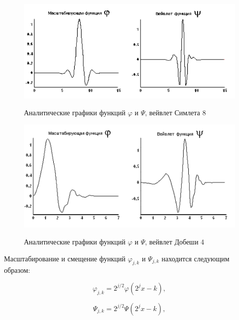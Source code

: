 \documentclass[utf8x, 14pt, oneside, a4paper]{article}
\begin{document}
	\newpage

	\begin{figure}[h!]
		\begin{center}
			{\includegraphics[scale = 1.0]{img/wavelet_simlet8.png}}
		\end{center}
		\caption{Аналитические графики функций $\varphi$ и $\Psi$, вейвлет Симлета 8}
		\label{ris:wavelet_simlet8}
	\end{figure}

	\begin{figure}[h!]
		\begin{center}
			{\includegraphics[scale = 0.8]{img/wavelet_dobeshi4.png}}
		\end{center}
		\caption{Аналитические графики функций $\varphi$ и $\Psi$, вейвлет Добеши 4}
		\label{ris:wavelet_dobeshi4}
	\end{figure}

	Масштабирование и смещение функций $\varphi_{j,k}$ и $\Psi_{j,k}$ находится следующим образом:
	
	\begin{equation}
		\varphi_{j,k} = 2^{j/2}\varphi(2^jx-k),
	\end{equation}

	\begin{equation}
		\Psi_{j,k} = 2^{j/2}\Psi(2^jx-k),
	\end{equation}
\end{document}

